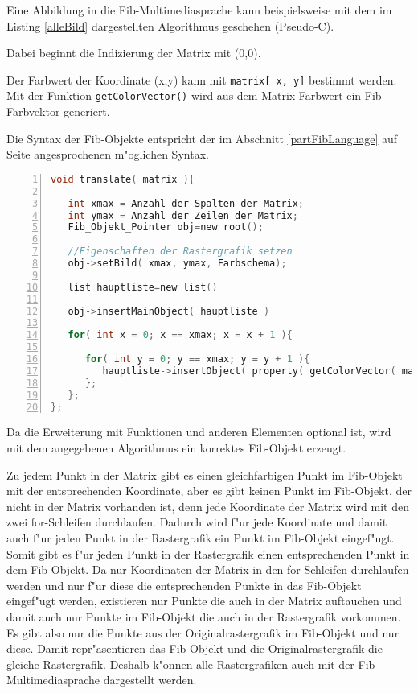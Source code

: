 Eine Abbildung in die Fib-Multimediasprache kann beispielsweise mit dem im Listing \ref{alleBild} dargestellten Algorithmus geschehen (Pseudo-C).

\begin{flushleft}
Dabei beginnt die Indizierung der Matrix mit (0,0).

Der Farbwert der Koordinate (x,y) kann mit \verb|matrix[ x, y]| bestimmt werden. Mit der Funktion \verb|getColorVector()| wird aus dem Matrix-Farbwert ein Fib-Farbvektor generiert.

Die Syntax der Fib-Objekte entspricht der im Abschnitt \ref{partFibLanguage} auf Seite \pageref{partFibLanguage} angesprochenen m"oglichen Syntax.
\end{flushleft}

\begin{lstlisting}[language=C, numbers=left, frame=single, caption={Algorithmus zur Erzeugung eines korrekten Fib-Objekts aus einer Bildmatrix}, label={alleBild}, breaklines, basicstyle=\footnotesize\ttfamily, numberstyle=\tiny]
void translate( matrix ){

   int xmax = Anzahl der Spalten der Matrix;
   int ymax = Anzahl der Zeilen der Matrix;
   Fib_Objekt_Pointer obj=new root();

   //Eigenschaften der Rastergrafik setzen
   obj->setBild( xmax, ymax, Farbschema);

   list hauptliste=new list()

   obj->insertMainObject( hauptliste )

   for( int x = 0; x == xmax; x = x + 1 ){

      for( int y = 0; y == xmax; y = y + 1 ){
         hauptliste->insertObject( property( getColorVector( matrix[x,y] ) , p( (x,y) ) ) );
      };
   };
};
\end{lstlisting}

\bigskip\noindent
Da die Erweiterung mit Funktionen und anderen Elementen optional ist, wird mit dem angegebenen Algorithmus ein korrektes Fib-Objekt erzeugt.

\bigskip\noindent
Zu jedem Punkt in der Matrix gibt es einen gleichfarbigen Punkt im Fib-Objekt mit der entsprechenden Koordinate, aber es gibt keinen Punkt im Fib-Objekt, der nicht in der Matrix vorhanden ist, denn jede Koordinate der Matrix wird mit den zwei for-Schleifen durchlaufen. Dadurch wird f"ur jede Koordinate und damit auch f"ur jeden Punkt in der Rastergrafik ein Punkt im Fib-Objekt eingef"ugt. Somit gibt es f"ur jeden Punkt in der Rastergrafik einen entsprechenden Punkt in dem Fib-Objekt.
Da nur Koordinaten der Matrix in den for-Schleifen durchlaufen werden und nur f"ur diese die entsprechenden Punkte in das Fib-Objekt eingef"ugt werden, existieren nur Punkte die auch in der Matrix auftauchen und damit auch nur Punkte im Fib-Objekt die auch in der Rastergrafik vorkommen.
Es gibt also nur die Punkte aus der Originalrastergrafik im Fib-Objekt und nur diese.
Damit repr"asentieren das Fib-Objekt und die Originalrastergrafik die gleiche Rastergrafik. Deshalb k"onnen alle Rastergrafiken auch mit der Fib-Multimediasprache dargestellt werden.

